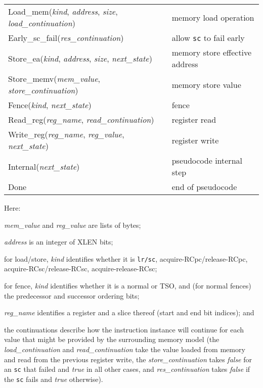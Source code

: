 \begin{center}
\begin{tabular}{l@{ \quad-\quad }l}
{\sc Load\_mem}({\it kind}, {\it address}, {\it size}, {\it load\_continuation})
    & memory load operation\\
{\sc Early\_sc\_fail}({\it res\_continuation})
    & allow {\tt sc} to fail early\\
{\sc Store\_ea}({\it kind}, {\it address}, {\it size}, {\it next\_state})
    & memory store effective address\\
{\sc Store\_memv}({\it mem\_value}, {\it store\_continuation})
    & memory store value\\
{\sc Fence}({\it kind}, {\it next\_state})
    & fence\\
{\sc Read\_reg}({\it reg\_name}, {\it read\_continuation})
    & register read\\
{\sc Write\_reg}({\it reg\_name}, {\it reg\_value}, {\it next\_state})
    & register write\\
{\sc Internal}({\it next\_state})
    & pseudocode internal step\\
{\sc Done}
    & end of pseudocode\\
\end{tabular}
\end{center}
Here:
\begin{tightlist}
\item {\it mem\_value} and {\it reg\_value} are lists of bytes;
\item {\it address} is an integer of XLEN bits;
\item for load/store, {\it kind} identifies whether it is {\tt lr/sc}, acquire-RCpc/release-RCpc, acquire-RCsc/release-RCsc, acquire-release-RCsc;
\item for fence, {\it kind} identifies whether it is a normal or TSO, and (for normal fences) the predecessor and successor ordering bits;
\item {\it reg\_name} identifies a register and a slice thereof (start and
  end bit indices); and
\item the continuations describe how the instruction instance will continue for each value that might be provided by the surrounding memory model (the {\it load\_continuation} and {\it read\_continuation} take the value loaded from memory and read from the previous register write, the {\it store\_continuation} takes {\it false} for an {\tt sc} that failed and {\it true} in all other cases, and {\it res\_continuation} takes {\it false} if the {\tt sc} fails and {\it true} otherwise).
\end{tightlist}

